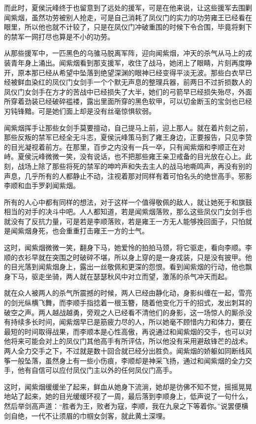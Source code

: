 而此时，夏侯沅峰终于也留意到了远处的援军，可是在他来说，让这些援军去围剿闻紫烟，虽然功劳被别人抢走，可是自己消耗了凤仪门的实力的功劳雍王已经看在眼里，所以他也就不计较了，只是在凤仪门冲破重围的时候下令合围，毕竟将剩下的禁军一网打尽也算是不小的功劳。

从那些援军中，一匹黑色的乌骓马脱离军阵，迎向闻紫烟，冲天的杀气从马上的戎装青年身上涌出。闻紫烟看到那支援军，收住了战马，她闭上了眼睛，片刻再度睁开，原本那已经从希望中坠落到绝望深渊的眼神已经变得平淡无波。那些白衣早已经被鲜血染红的凤仪门女剑手一个个默无声息的整理兵器，前两日不过折损数人的凤仪门女剑手在方才的苦战中已经损失了大半，她们的弓箭早已经损失殆尽，外面所穿着劲装已经破碎褴褛，露出里面所穿的黑色软甲，可以切金断玉的宝剑也已经刃钝锋黯。可是她们面上却是没有丝毫惊惧软弱。

闻紫烟挥手让那些女剑手莫要擅动，自己提马上前，迎上那人。就在着片刻之前，那些反叛的禁军已经全无斗志，夏侯沅峰策马到了雍王身边，正要报告，只见李贽的目光凝视着前方。在那里，百步之内没有一兵一卒，只有闻紫烟和李顺正在对峙。夏侯沅峰微微一笑，没有说话，也不把那些雍王亲卫戒备的目光放在心上。此刻，战场上除了那些将死的禁军的呻吟声和失去主人的战马地嘶鸣声，再没有别的声息，几乎所有的人都静止不动，注视着那对同样有着可怕名头的绝世高手。邪影李顺和血手罗刹闻紫烟。

所有的人心中都有同样的想法，对于这样一个值得敬佩的敌人，就让她死于和旗鼓相当的对手的决斗中吧。人人都知道，若是闻紫烟落败，那么这些凤仪门女剑手也就没有了反抗力量，可是若是李顺落败，若是雍王一方无人能够挽回面子，只怕就是闻紫烟身死，也会重重打击雍王一方的士气。

这时，闻紫烟微微一笑，翻身下马，她爱怜的拍拍马颈，将它驱走，看向李顺。李顺的衣衫早就在突围之时破碎不堪，所以身上穿的是一身戎装，只是没有披甲。他的目光落到闻紫烟身上，露出一丝敬佩和更深的怨恨。看到闻紫烟的行动，他也飘身下马，驱走坐骑，两人就在瑟瑟秋风中对立而望，激荡的杀气冲天而起。

就在众人被两人的杀气所震撼的时候，两人已经由静化动，身影纠缠在一起，雪亮的剑光纵横飞舞，而李顺手指捻着一根玉簪，随着他变化万千的招式，发出刺耳的破空之声。两人越战越勇，旁观之人已经看不清他们的身影，这一场惊人的厮杀没有持续多长时间，闻紫烟早已是筋疲力尽的人，所以她毫不顾惜内力和体力，要在最短的时间取得战果，而李顺本是心性高傲，再说通过和闻紫烟的交手，也可以对他将来可能会对上的凤仪门其他高手有所评估，所以他没有采用避敌锋芒的战术。两人全力交手之下，不过就是数十回合就已经分出胜负。闻紫烟的娇躯如同断线风筝一般坠落，虽然身上有一些小伤痕，李顺却是神采飞扬，通过和闻紫烟的全力交手，他有自信可以应付凤仪门主以外的任何凤仪门高手。

这时，闻紫烟缓缓坐了起来，鲜血从她身下流淌，她却是彷佛不知不觉，摇摇晃晃地站了起来，她的目光缓缓环视了一周，最后落到李顺身上，低声说了一句什么，然后举剑高声道：“胜者为王，败者为寇，李顺，我在九泉之下等着你。”说罢便横剑自绝，一代不让须眉的巾帼女剑客，就此黄土深埋。

